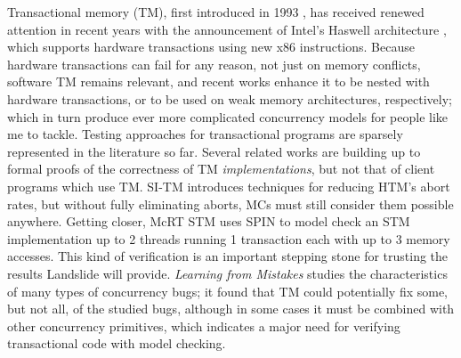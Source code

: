 Transactional memory (TM), first introduced in 1993 \cite{transactional-memory},
has received renewed attention in recent years with the announcement of Intel's Haswell architecture \cite{htm-haswell},
which supports hardware transactions using new x86 instructions.
Because hardware transactions can fail for any reason, not just on memory conflicts,
software TM remains relevant,
and recent works \cite{hybrid-htm-stm,stm-relaxed-memory} enhance it to be nested with hardware transactions, or to be used on weak memory architectures, respectively;
which in turn produce ever more complicated concurrency models for people like me to tackle.
%
Testing approaches for transactional programs are sparsely represented in the literature so far.
Several related works \cite{tm-correctness,tm-completeness,specifying-verifying-tm} are building up to formal proofs of the correctness of TM {\em implementations},
but not that of client programs which use TM.
SI-TM \cite{si-tm} introduces techniques for reducing HTM's abort rates, but without fully eliminating aborts, MCs must still consider them possible anywhere.
Getting closer, McRT STM \cite{mc-tm-with-spin} uses SPIN \cite{spin} to model check an STM implementation
up to 2 threads running 1 transaction each with up to 3 memory accesses.
This kind of verification is an important stepping stone for trusting the results Landslide will provide.
%
{\em Learning from Mistakes} \cite{learning-from-mistakes} studies the characteristics of many types of concurrency bugs;
it found that TM could potentially fix some, but not all, of the studied bugs,
although in some cases it must be combined with other concurrency primitives,
which indicates a major need for verifying transactional code with model checking.
